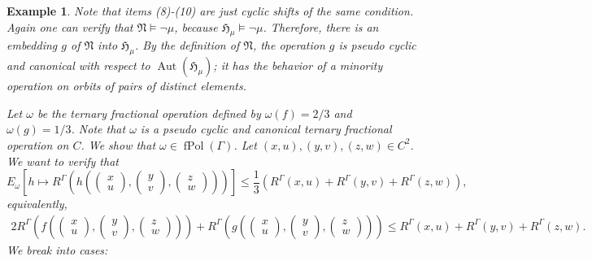\documentclass[nonacm]{acmart}
\newcommand{\bH}{{\mathfrak H}}
\newcommand{\bN}{{\mathfrak N}}
\DeclareMathOperator{\Aut}{Aut}
\DeclareMathOperator{\fPol}{fPol}
\newtheorem{expl}[theorem]{Example}
\begin{document}
\begin{expl}
Note that items (8)-(10) are just cyclic shifts of the same condition. Again one can verify that $\bN \models \neg \mu$, because $\bH_\mu \models \neg \mu$. Therefore, there is an embedding $g$ of $\bN$ into $\bH_\mu$. By the definition of $\bN$, the operation $g$ is pseudo cyclic and canonical with respect to $\Aut(\bH_\mu)$; it has the behavior of a minority operation on orbits of pairs of distinct elements. 

Let $\omega$ be the ternary fractional operation defined by $\omega(f)=2/3$ and $\omega(g)=1/3$. Note that $\omega$ is a pseudo cyclic and canonical ternary fractional operation on $C$. We show that $\omega \in \fPol(\Gamma)$.
Let $(x,u), (y,v), (z,w) \in C^2$. We want to verify that
\[E_\omega \left[h \mapsto R^\Gamma\left(h \left(\begin{pmatrix}x\\u\end{pmatrix},
\begin{pmatrix}y\\v\end{pmatrix}, \begin{pmatrix}z\\w\end{pmatrix} \right) \right) \right] \leq \frac{1}{3}(R^\Gamma(x,u)+R^\Gamma(y,v)+R^\Gamma(z,w)),\]
equivalently, 
\begin{align} \label{eq:maj_min}
2 R^\Gamma\left( f\left( \begin{pmatrix}x\\u\end{pmatrix}, \begin{pmatrix}y\\v\end{pmatrix}, \begin{pmatrix}z\\w\end{pmatrix} \right) \right) + 
R^\Gamma\left(g \left( \begin{pmatrix}x\\u\end{pmatrix}, \begin{pmatrix}y\\v\end{pmatrix}, \begin{pmatrix}z\\w\end{pmatrix} \right)\right)
\leq R^\Gamma(x,u)+R^\Gamma(y,v)+R^\Gamma(z,w).
\end{align}
We break into cases:
\begin{itemize}

\end{itemize}
\end{expl}
\end{document}

